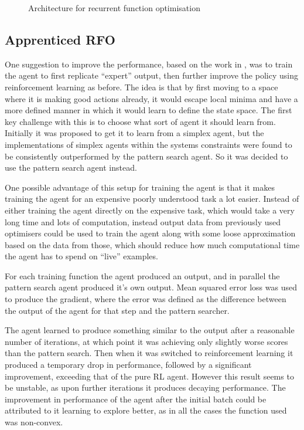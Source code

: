 \begin{figure}
\centering

\caption{Architecture for recurrent function optimisation}
\label{fig:RFOarch}
\end{figure}

\subsection{Apprenticed RFO}
One suggestion to improve the performance, based on the work in \cite{alphaGO}, was to train the agent to first replicate ``expert'' output, then further improve the policy using reinforcement learning as before. The idea is that by first moving to a space where it is making good actions already, it would escape local minima and have a more defined manner in which it would learn to define the state space. The first key challenge with this is to choose what sort of agent it should learn from. Initially it was proposed to get it to learn from a simplex agent, but the implementations of simplex agents within the systems constraints were found to be consistently outperformed by the pattern search agent. So it was decided to use the pattern search agent instead.

One possible advantage of this setup for training the agent is that it makes training the agent for an expensive poorly understood task a lot easier. Instead of either training the agent directly on the expensive task, which would take a very long time and lots of computation, instead output data from previously used optimisers could be used to train the agent along with some loose approximation based on the data from those, which should reduce how much computational time the agent has to spend on ``live'' examples.

For each training function the agent produced an output, and in parallel the pattern search agent produced it's own output. Mean squared error loss was used to produce the gradient, where the error was defined as the difference between the output of the agent for that step and the pattern searcher.

The agent learned to produce something similar to the output after a reasonable number of iterations, at which point it was achieving only slightly worse scores than the pattern search. Then when it was switched to reinforcement learning it produced a temporary drop in performance, followed by a significant improvement, exceeding that of the pure RL agent. However this result seems to be unstable, as upon further iterations it produces decaying performance. The improvement in performance of the agent after the initial batch could be attributed to it learning to explore better, as in all the cases the function used was non-convex.


